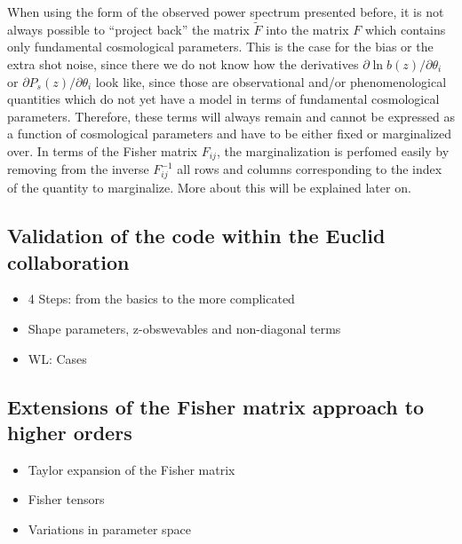 When using the form of the observed power spectrum presented before,
it is not always possible to ``project back'' the matrix $\tilde{F}$
into the matrix $F$ which contains only fundamental cosmological
parameters. This is the case for the bias or the extra shot noise,
since there we do not know how the derivatives $\partial\ln b(z)/\partial\theta_{i}$
or $\partial P_{s}(z)/\partial\theta_{i}$ look like, since those
are observational and/or phenomenological quantities which do not
yet have a model in terms of fundamental cosmological parameters.
Therefore, these terms will always remain and cannot be expressed
as a function of cosmological parameters and have to be either fixed
or marginalized over. In terms of the Fisher matrix $F_{ij}$, the
marginalization is perfomed easily by removing from the inverse $F_{ij}^{-1}$
all rows and columns corresponding to the index of the quantity to
marginalize. More about this will be explained later on.



\subsection{Validation of the code within the Euclid collaboration}
\begin{itemize}
\item 4 Steps: from the basics to the more complicated
\item Shape parameters, z-obswevables and non-diagonal terms
\item WL: Cases
\end{itemize}

\subsection{Extensions of the Fisher matrix approach to higher orders}
\begin{itemize}
\item Taylor expansion of the Fisher matrix
\item Fisher tensors
\item Variations in parameter space
\end{itemize}






